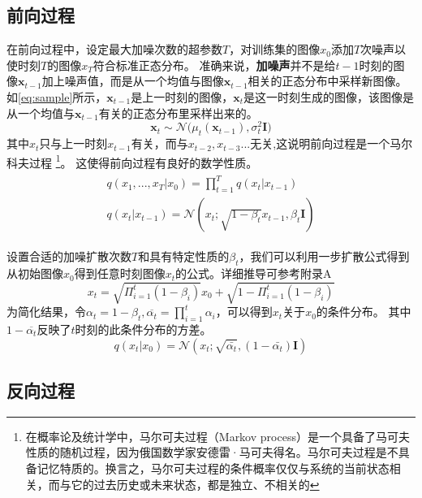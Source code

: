 \subsection{前向过程}
在前向过程中，设定最大加噪次数的超参数$T$，对训练集的图像$x_0$添加$T$次噪声以使时刻$T$的图像$x_T$符合标准正态分布。
准确来说，\textbf{加噪声}并不是给$t-1$时刻的图像$\mathbf{x}_{t-1}$加上噪声值，而是从一个均值与图像$\mathbf{x}_{t-1}$相关的正态分布中采样新图像。
如\autoref{eq:sample}所示，$\mathbf{x}_{t-1}$是上一时刻的图像，$\mathbf{x}_t$是这一时刻生成的图像，该图像是从一个均值与$\mathbf{x}_{t-1}$有关的正态分布里采样出来的。
\begin{equation}
    \mathbf{x}_t\sim\mathcal{N}\Big(\mu_t(\mathbf{x}_{t-1}),\sigma_t^2\mathbf{I}\Big)
    \label{eq:sample}
\end{equation}
其中$x_t$只与上一时刻$x_{t-1}$有关，而与$x_{t-2},x_{t-3}...$无关,这说明前向过程是一个马尔科夫过程
\footnote{在概率论及统计学中，马尔可夫过程（Markov process）是一个具备了马可夫性质的随机过程，因为俄国数学家安德雷·马可夫得名。马尔可夫过程是不具备记忆特质的。换言之，马尔可夫过程的条件概率仅仅与系统的当前状态相关，而与它的过去历史或未来状态，都是独立、不相关的}。
这使得前向过程有良好的数学性质。
\begin{align*}
    \begin{split}
        q(x_1,...,x_T|x_0)=\prod_{t=1}^{T}q(x_t|x_{t-1})\\ 
        q(x_t|x_{t-1})=\mathcal{N}(x_t;\sqrt{1-\beta_t}x_{t-1},\beta_t\mathbf{I})
    \end{split}
\end{align*}

设置合适的加噪扩散次数$T$和具有特定性质的$\beta_t$，我们可以利用一步扩散公式得到从初始图像$x_0$得到任意时刻图像$x_t$的公式。详细推导可参考附录A
\begin{equation}
    x_t=\sqrt{\Pi_{i=1}^{t}(1-\beta_i)}x_0+\sqrt{1-\Pi_{i=1}^{t}(1-\beta_i)}
\end{equation}
为简化结果，令$\alpha_t=1-\beta_t,\overline{\alpha_t}=\prod_{i=1}^{t}\alpha_i$，可以得到$x_t$关于$x_0$的条件分布。
其中$1-\overline{\alpha_t}$反映了$t$时刻的此条件分布的方差。
\begin{equation}
    q(x_t|x_0)=\mathcal{N}(x_t;\sqrt{\bar{\alpha_t}},(1-\bar{\alpha_t})\mathbf{I})
\end{equation}

\subsection{反向过程}

